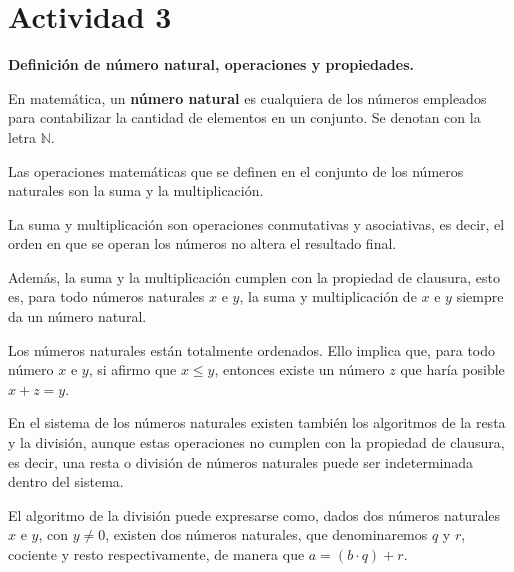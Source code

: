 \section*{Actividad 3}
\textbf{Definición de número natural, operaciones y propiedades.}

En matemática, un \textbf{número natural} es cualquiera de los números empleados para contabilizar la cantidad de elementos en un conjunto. Se denotan con la letra $\mathbb{N}$.

Las operaciones matemáticas que se definen en el conjunto de los números naturales son la suma y la multiplicación.

La suma y multiplicación son operaciones conmutativas y asociativas, es decir, el orden en que se operan los números no altera el resultado final.

Además, la suma y la multiplicación cumplen con la propiedad de clausura, esto es, para todo números naturales $x$ e $y$, la suma y multiplicación de $x$ e $y$ siempre da un número natural.

Los números naturales están totalmente ordenados. Ello implica que, para todo número $x$ e $y$, si afirmo que $x \le y$, entonces existe un número $z$ que haría posible $x + z = y$. 

En el sistema de los números naturales existen también los algoritmos de la resta y la división, aunque estas operaciones no cumplen con la propiedad de clausura, es decir, una resta o división de números naturales puede ser indeterminada dentro del sistema.

El algoritmo de la división puede expresarse como, dados dos números naturales $x$ e $y$, con $y \neq 0$, existen dos números naturales, que denominaremos $q$ y $r$, cociente y resto respectivamente, de manera que $a = (b \cdot q) + r$.

